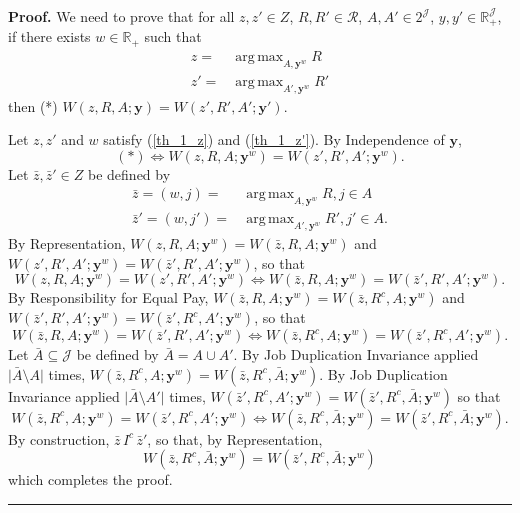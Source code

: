 \documentclass[12pt]{article}
\DeclareMathOperator*{\argmax}{arg\,max}
\newenvironment{proof}[1][Proof]{\noindent \textbf{#1.} }{\  \rule{0.5em}{0.5em}}
\begin{document}
\begin{proof}
    We need to prove that for all $z,z'\in Z$, $R,R'\in\mathcal{R}$, $A,A'\in 2^{\mathcal{J}}$, $y,y'\in\mathbb{R}_{+}^{\mathcal{J}}$, if there exists $w\in\mathbb{R}_{+}$ such that 
    \begin{align}
        z=&\argmax_{A,\mathbf{y}^w}R\label{th_1_z}\\
        z'=&\argmax_{A',\mathbf{y}^w}R'\label{th_1_z'}
    \end{align}
    then (*) $W(z,R,A;\mathbf{y})=W(z',R',A';\mathbf{y}')$.

    Let $z,z'$ and $w$ satisfy (\ref{th_1_z}) and (\ref{th_1_z'}). By Independence of $\mathbf{y}$, 
    \begin{equation*}
        (*)\Leftrightarrow W(z,R,A;\mathbf{y}^w)=W(z',R',A';\mathbf{y}^w).
    \end{equation*}
    Let $\bar{z},\bar{z}'\in Z$ be defined by
    \begin{align*}
        \bar{z}=(w,j)=& \argmax_{A,\mathbf{y}^w}R, j\in A\\
        \bar{z}'=(w,j')=& \argmax_{A',\mathbf{y}^w}R', j'\in A.
    \end{align*}
    By Representation, $W(z,R,A;\mathbf{y}^w)=W(\bar{z},R,A;\mathbf{y}^w)$ and $W(z',R',A';\mathbf{y}^w)=W(\bar{z}',R',A';\mathbf{y}^w)$, so that
    \begin{equation*}
        W(z,R,A;\mathbf{y}^w)=W(z',R',A';\mathbf{y}^w) \Leftrightarrow W(\bar{z},R,A;\mathbf{y}^w)=W(\bar{z}',R',A';\mathbf{y}^w).
    \end{equation*}
    By Responsibility for Equal Pay, $W(\bar{z},R,A;\mathbf{y}^w)=W(\bar{z},R^c,A;\mathbf{y}^w)$ and $W(\bar{z}',R',A';\mathbf{y}^w)=W(\bar{z}',R^c,A';\mathbf{y}^w)$, so that
    \begin{equation*}
        W(\bar{z},R,A;\mathbf{y}^w)=W(\bar{z}',R',A';\mathbf{y}^w) \Leftrightarrow W(\bar{z},R^c,A;\mathbf{y}^w)=W(\bar{z}',R^c,A';\mathbf{y}^w).
    \end{equation*}
    Let $\bar{A}\subseteq\mathcal{J}$ be defined by $\bar{A}=A\cup A'$. By Job Duplication Invariance applied $\lvert \bar{A}\setminus A \rvert$ times, $W(\bar{z},R^c,A;\mathbf{y}^w)=W(\bar{z},R^c,\bar{A};\mathbf{y}^w)$. By Job Duplication Invariance applied $\lvert \bar{A}\setminus A' \rvert$ times, $W(\bar{z}',R^c,A';\mathbf{y}^w)=W(\bar{z}',R^c,\bar{A};\mathbf{y}^w)$ so that 
    \begin{equation*}
        W(\bar{z},R^c,A;\mathbf{y}^w)=W(\bar{z}',R^c,A';\mathbf{y}^w) \Leftrightarrow W(\bar{z},R^c,\bar{A};\mathbf{y}^w)=W(\bar{z}',R^c,\bar{A};\mathbf{y}^w).
    \end{equation*}
    By construction, $\bar{z}\,I^c\,\bar{z}'$, so that, by Representation, 
    \begin{equation*}
        W(\bar{z},R^c,\bar{A};\mathbf{y}^w)=W(\bar{z}',R^c,\bar{A};\mathbf{y}^w)
    \end{equation*}
    which completes the proof.
\end{proof}
\end{document}
